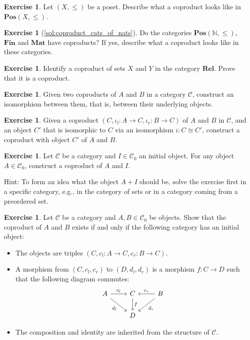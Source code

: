 \documentclass[a4paper,11pt, oneside,titlepage=false]{scrbook}
\theoremstyle{plain}
\theoremstyle{definition}
\newtheorem{exer}[thm]{Exercise}
\newcommand{\Cat}[1]{\mathcal{#1}}
\newcommand{\CC}{\Cat{C}}
\newcommand{\Catb}[1]{\mathbf{#1}}
\newcommand{\POS}{\Catb{Pos}}
\newcommand{\MAT}{\Catb{Mat}}
\newcommand{\SKELFINSET}{\Catb{Fin}}
\newcommand{\REL}{\Catb{Rel}}
\newcommand{\Ob}[1]{{#1}_0}
\newcommand{\inl}{\ensuremath{\iota_l}}
\newcommand{\inr}{\ensuremath{\iota_r}}
\newcommand{\NN}{\ensuremath{\mathbb{N}}}
\begin{document}
\begin{exer}\label{exer:coproduct_posetcat}
  Let $(X,\leq)$ be a poset. Describe what a coproduct looks like in  $\POS(X,\leq)$.
\end{exer}

\begin{exer}[\cref{sol:coproduct_cats_of_nats}]\label{exer:coproduct_cats_of_nats}
  Do the categories $\POS(\NN, \leq)$, $\SKELFINSET$ and $\MAT$ have coproducts? If yes, describe what a coproduct looks like in these categories. 
\end{exer}

\begin{exer}\label{exer:coproduct_rel}
  Identify a coproduct of sets $X$ and $Y$ in the category $\REL$. Prove that it is a coproduct. 
\end{exer}

\begin{exer}\label{exer:coproduct-unique}
  Given two coproducts of $A$ and $B$ in a category $\CC$, construct an isomorphism between them, that is, between their underlying objects.
\end{exer}

\begin{exer}\label{exer:coproduct_preserved_by_iso}
  Given a coproduct $(C,\inl : A \to C ,\inr : B \to C)$ of $A$ and $B$ in $\CC$, and an object $C'$ that is isomorphic to $C$ via an isomorphism $i : C \cong C'$, construct a coproduct with object $C'$ of $A$ and $B$.
\end{exer}

\begin{exer}\label{exer:coproduct_with_initial} Let $\CC$ be a category and $I\in\Ob{\CC}$ an initial object.
  For any object $A\in \Ob{\CC}$, construct a coproduct of $A$ and $I$.

  Hint: To form an idea what the object $A + I$ should be, solve the exercise first in a specific category, e.g., in the category of sets or in a category coming from a preordered set.
\end{exer}

\begin{exer}\label{exer:coproduct_iff_initial_in_subcategory} Let $\CC$ be a category and $A,B\in\Ob{\CC}$ be objects. Show that the coproduct of $A$ and $B$ exists if and only if the following category has an initial object:
\begin{itemize}
\item The objects are triples $(C,c_l: A\to C, c_r:B\to C)$.
\item A morphism from $(C,c_l,c_r)$ to $(D,d_l,d_r)$ is a morphism $f : C \to D$ such that the following diagram commutes:
\[
    \begin{tikzcd}
      A \ar[r, "c_l"] \ar[rd, "d_l"']
      &
      C  \ar[d, "f"]
      &
      B \ar[l, "c_r"'] \ar[ld, "d_r"]
      \\
      &
      D
    \end{tikzcd}
  \]
\item The composition and identity are inherited from the structure of $\CC$.
\end{itemize}
\end{exer}
\end{document}
